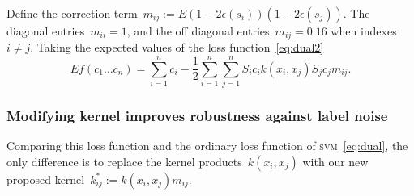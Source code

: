 \documentclass[12pt]{article} %
\newcommand{\svm}{\textsc{svm}}
\begin{document}
Define the correction term~$m_{ij}:=E(1-2\epsilon(s_i))(1-2\epsilon(s_j))$. The diagonal entries~$m_{ii}=1$, and the off diagonal entries~$m_{ij}=0.16$ when indexes~$i\neq j$. Taking the expected values of the loss function~\eqref{eq:dual2}
\begin{equation}
   Ef(c_{1}\ldots c_{n})=\sum _{i=1}^{n}c_{i}-{\frac {1}{2}}\sum _{i=1}^{n}\sum _{j=1}^{n}S_{i}c_{i}k(x_{i},x_{j})S_{j}c_{j}m_{ij}. \label{eq:dual3}
\end{equation}

\subsubsection{Modifying kernel improves robustness against label noise} \label{sec:mod}

Comparing this loss function and the ordinary loss function of \svm\ \eqref{eq:dual}, the only difference is to replace the kernel products~$k(x_i,x_j)$ with our new proposed kernel~$k^*_{ij}:=k(x_i,x_j)m_{ij}$.



\end{document}
